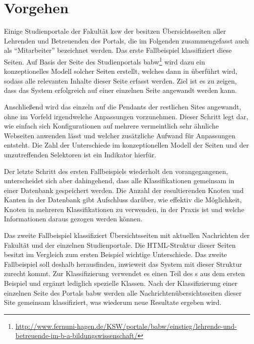 \section{Vorgehen}
    \label{section:findingsMethod}
    Einige Studienportale der Fakultät \gls{ksw} der {\fernUni}
    besitzen Übersichtsseiten aller Lehrenden und Betreuenden des Portals,
    die im Folgenden zusammengefasst auch als "`Mitarbeiter"' bezeichnet werden.
    Das erste Fallbeispiel klassifiziert diese Seiten.
    Auf Basis der Seite des Studienportals
    \gls{babw}\footnote{\url{http://www.fernuni-hagen.de/KSW/portale/babw/einstieg/lehrende-und-betreuende-im-b-a-bildungswissenschaft/}}
    wird dazu ein konzeptionelles Modell solcher Seiten erstellt,
    welches dann in {\classificationModel} überführt wird,
    sodass alle relevanten Inhalte dieser Seite erfasst werden.
    Ziel ist es zu zeigen, dass das System erfolgreich auf einer einzelnen Seite angewandt werden kann.

    Anschließend wird das {\classificationModel} einzeln auf die Pendants der restlichen Sites angewandt,
    ohne im Vorfeld irgendwelche Anpassungen vorzunehmen.
    Dieser Schritt legt dar, wie einfach sich Konfigurationen auf mehrere vermeintlich
    sehr ähnliche Webseiten anwenden lässt und welcher zusätzliche Aufwand für Anpassungen entsteht.
    Die Zahl der Unterschiede im konzeptionellen Modell der Seiten und der unzutreffenden Selektoren ist ein Indikator hierfür.

    Der letzte Schritt des ersten Fallbeispiels wiederholt den vorangegangenen,
    unterscheidet sich aber dahingehend, dass alle Klassifikationen
    gemeinsam in einer Datenbank gespeichert werden.
    Die Anzahl der resultierenden Knoten und Kanten in der Datenbank
    gibt Aufschluss darüber, wie effektiv die Möglichkeit, Knoten in mehreren Klassifikationen
    zu verwenden, in der Praxis ist und welche Informationen daraus gezogen werden können.

    Das zweite Fallbeispiel klassifiziert Übersichtsseiten mit aktuellen Nachrichten
    der Fakultät und der einzelnen Studienportale.
    Die HTML-Struktur dieser Seiten besitzt im Vergleich zum ersten Beispiel wichtige Unterschiede.
    Das zweite Fallbeispiel soll deshalb herausfinden, inwieweit das System mit dieser Struktur zurecht kommt.
    Zur Klassifizierung verwendet es einen Teil des {\classificationModel}s aus dem ersten Beispiel
    und ergänzt lediglich spezielle Klassen.
    Nach der Klassifizierung einer einzelnen Seite des Portals \gls{babw}
    werden alle Nachrichtenübersichtsseiten dieser Site gemeinsam klassifiziert,
    was wiederum neue Resultate ergeben wird.

